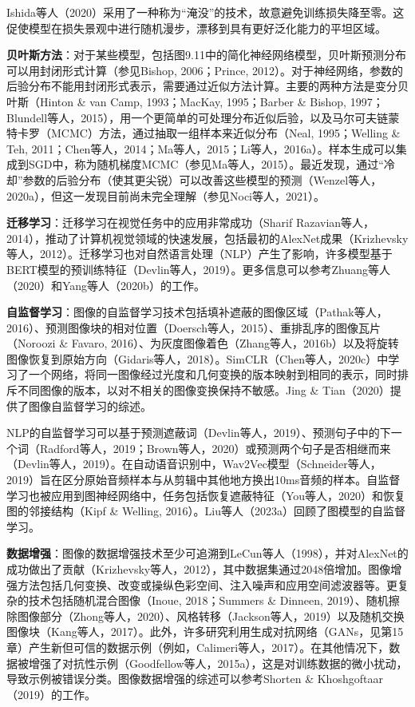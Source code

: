 \documentclass[lang=cn,newtx,10pt,scheme=chinese]{elegantbook}
\begin{document}
Ishida等人（2020）采用了一种称为“淹没”的技术，故意避免训练损失降至零。这促使模型在损失景观中进行随机漫步，漂移到具有更好泛化能力的平坦区域。

\textbf{贝叶斯方法}：对于某些模型，包括图9.11中的简化神经网络模型，贝叶斯预测分布可以用封闭形式计算（参见Bishop, 2006；Prince, 2012）。对于神经网络，参数的后验分布不能用封闭形式表示，需要通过近似方法计算。主要的两种方法是变分贝叶斯（Hinton \& van Camp, 1993；MacKay, 1995；Barber \& Bishop, 1997；Blundell等人，2015），用一个更简单的可处理分布近似后验，以及马尔可夫链蒙特卡罗（MCMC）方法，通过抽取一组样本来近似分布（Neal, 1995；Welling \& Teh, 2011；Chen等人，2014；Ma等人，2015；Li等人，2016a）。样本生成可以集成到SGD中，称为随机梯度MCMC（参见Ma等人，2015）。最近发现，通过“冷却”参数的后验分布（使其更尖锐）可以改善这些模型的预测（Wenzel等人，2020a），但这一发现目前尚未完全理解（参见Noci等人，2021）。

\textbf{迁移学习}：迁移学习在视觉任务中的应用非常成功（Sharif Razavian等人，2014），推动了计算机视觉领域的快速发展，包括最初的AlexNet成果（Krizhevsky等人，2012）。迁移学习也对自然语言处理（NLP）产生了影响，许多模型基于BERT模型的预训练特征（Devlin等人，2019）。更多信息可以参考Zhuang等人（2020）和Yang等人（2020b）的工作。

\textbf{自监督学习}：图像的自监督学习技术包括填补遮蔽的图像区域（Pathak等人，2016）、预测图像块的相对位置（Doersch等人，2015）、重排乱序的图像瓦片（Noroozi \& Favaro, 2016）、为灰度图像着色（Zhang等人，2016b）以及将旋转图像恢复到原始方向（Gidaris等人，2018）。SimCLR（Chen等人，2020c）中学习了一个网络，将同一图像经过光度和几何变换的版本映射到相同的表示，同时排斥不同图像的版本，以对不相关的图像变换保持不敏感。Jing \& Tian（2020）提供了图像自监督学习的综述。

NLP的自监督学习可以基于预测遮蔽词（Devlin等人，2019）、预测句子中的下一个词（Radford等人，2019；Brown等人，2020）或预测两个句子是否相继而来（Devlin等人，2019）。在自动语音识别中，Wav2Vec模型（Schneider等人，2019）旨在区分原始音频样本与从剪辑中其他地方换出10ms音频的样本。自监督学习也被应用到图神经网络中，任务包括恢复遮蔽特征（You等人，2020）和恢复图的邻接结构（Kipf \& Welling, 2016）。Liu等人（2023a）回顾了图模型的自监督学习。

\textbf{数据增强}：图像的数据增强技术至少可追溯到LeCun等人（1998），并对AlexNet的成功做出了贡献（Krizhevsky等人，2012），其中数据集通过2048倍增加。图像增强方法包括几何变换、改变或操纵色彩空间、注入噪声和应用空间滤波器等。更复杂的技术包括随机混合图像（Inoue, 2018；Summers \& Dinneen, 2019）、随机擦除图像部分（Zhong等人，2020）、风格转移（Jackson等人，2019）以及随机交换图像块（Kang等人，2017）。此外，许多研究利用生成对抗网络（GANs，见第15章）产生新但可信的数据示例（例如，Calimeri等人，2017）。在其他情况下，数据被增强了对抗性示例（Goodfellow等人，2015a），这是对训练数据的微小扰动，导致示例被错误分类。图像数据增强的综述可以参考Shorten \& Khoshgoftaar（2019）的工作。
\end{document}
